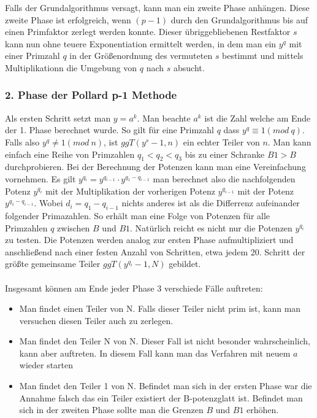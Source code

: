 \documentclass[a4paper,11pt]{article}
\begin{document}
Falls der Grundalgorithmus  versagt, kann man ein zweite Phase anhängen. Diese zweite Phase
ist erfolgreich, wenn $(p-1)$ durch den Grundalgorithmus bis auf einen Primfaktor zerlegt werden
konnte. Dieser übriggebliebenen Restfaktor $s$ kann nun ohne teuere Exponentiation ermittelt werden,
in dem man ein $y^q$ mit einer Primzahl $q$ in der Größenordnung des vermuteten $s$ bestimmt und
mittels Multiplikationn die Umgebung von $q$ nach $s$ absucht.

\subsubsection*{2. Phase der Pollard p-1 Methode}

Als ersten Schritt setzt man $y = a^k$. Man beachte $a^k$ ist die Zahl welche am Ende der 1.
Phase berechnet wurde. So gilt für eine Primzahl $q$ dass $y^q \equiv 1 (mod \ q)$. Falls also
$y^q \neq 1 (mod\ n)$, ist $ggT(y^s -1, n)$ ein echter Teiler von $n$. Man
kann einfach eine Reihe von Primzahlen $q_1 < q_2 < q_3 $ bis zu einer Schranke $B1 > B$
durchprobieren. Bei der Berechnung der Potenzen kann man eine Vereinfachung vornehmen.
Es gilt $y^{q_i} = y^{q_{i-1}}\cdot y^{q_1 - q_{i-1}}$ man berechnet also die nachfolgenden Potenz  $y^{q_i}$ mit
der Multiplikation der vorherigen Potenz $y^{q_{i-1}}$ mit der Potenz $y^{q_1 - q_{i-1}}$. Wobei
$d_i = q_1 - q_{i-1}$ nichts anderes ist als die Differrenz aufeinander folgender Primazahlen. So erhält
man eine Folge von Potenzen für alle Primzahlen $q$ zwischen $B$ und $B1$. Natürlich
reicht es nicht nur die
Potenzen $y^{q_i}$ zu testen. Die Potenzen werden analog zur ersten Phase aufmultipliziert und
anschließend nach einer festen Anzahl von Schritten, etwa jedem 20. Schritt der größte gemeinsame Teiler
$ggT(y^{q_i}-1, N)$ gebildet.\\\\
Insgesamt können am Ende jeder Phase 3 verschiede Fälle auftreten:
\begin{itemize}
\item Man findet einen Teiler von N. Falls dieser Teiler nicht prim ist, kann man versuchen
	diesen Teiler auch zu zerlegen.
\item Man findet den Teiler N von N. Dieser Fall ist nicht besonder wahrscheinlich, kann aber auftreten.
	In diesem Fall kann man das Verfahren mit neuem $a$ wieder starten

\item Man findet den Teiler 1 von N. Befindet man sich in der ersten Phase war die Annahme falsch das ein Teiler
	existiert der B-potenzglatt ist. Befindet man sich in der zweiten Phase sollte
 	man die Grenzen $B$ und $B1$ erhöhen.
\end{itemize}
\end{document}

